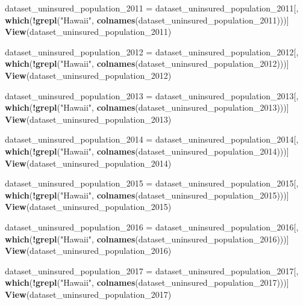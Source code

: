 \documentclass[
]{article}
\newenvironment{Shaded}{\begin{snugshade}}{\end{snugshade}}
\newcommand{\FunctionTok}[1]{\textcolor[rgb]{0.13,0.29,0.53}{\textbf{#1}}}
\newcommand{\NormalTok}[1]{#1}
\newcommand{\OtherTok}[1]{\textcolor[rgb]{0.56,0.35,0.01}{#1}}
\newcommand{\SpecialCharTok}[1]{\textcolor[rgb]{0.81,0.36,0.00}{\textbf{#1}}}
\newcommand{\StringTok}[1]{\textcolor[rgb]{0.31,0.60,0.02}{#1}}
\begin{document}
\begin{Shaded}
\begin{Highlighting}[]
\NormalTok{dataset\_uninsured\_population\_2011 }\OtherTok{=}\NormalTok{ dataset\_uninsured\_population\_2011[, }\FunctionTok{which}\NormalTok{(}\SpecialCharTok{!}\FunctionTok{grepl}\NormalTok{(}\StringTok{"Hawaii"}\NormalTok{, }\FunctionTok{colnames}\NormalTok{(dataset\_uninsured\_population\_2011)))]}
\FunctionTok{View}\NormalTok{(dataset\_uninsured\_population\_2011)}

\NormalTok{dataset\_uninsured\_population\_2012 }\OtherTok{=}\NormalTok{ dataset\_uninsured\_population\_2012[, }\FunctionTok{which}\NormalTok{(}\SpecialCharTok{!}\FunctionTok{grepl}\NormalTok{(}\StringTok{"Hawaii"}\NormalTok{, }\FunctionTok{colnames}\NormalTok{(dataset\_uninsured\_population\_2012)))]}
\FunctionTok{View}\NormalTok{(dataset\_uninsured\_population\_2012)}

\NormalTok{dataset\_uninsured\_population\_2013 }\OtherTok{=}\NormalTok{ dataset\_uninsured\_population\_2013[, }\FunctionTok{which}\NormalTok{(}\SpecialCharTok{!}\FunctionTok{grepl}\NormalTok{(}\StringTok{"Hawaii"}\NormalTok{, }\FunctionTok{colnames}\NormalTok{(dataset\_uninsured\_population\_2013)))]}
\FunctionTok{View}\NormalTok{(dataset\_uninsured\_population\_2013)}

\NormalTok{dataset\_uninsured\_population\_2014 }\OtherTok{=}\NormalTok{ dataset\_uninsured\_population\_2014[, }\FunctionTok{which}\NormalTok{(}\SpecialCharTok{!}\FunctionTok{grepl}\NormalTok{(}\StringTok{"Hawaii"}\NormalTok{, }\FunctionTok{colnames}\NormalTok{(dataset\_uninsured\_population\_2014)))]}
\FunctionTok{View}\NormalTok{(dataset\_uninsured\_population\_2014)}

\NormalTok{dataset\_uninsured\_population\_2015 }\OtherTok{=}\NormalTok{ dataset\_uninsured\_population\_2015[, }\FunctionTok{which}\NormalTok{(}\SpecialCharTok{!}\FunctionTok{grepl}\NormalTok{(}\StringTok{"Hawaii"}\NormalTok{, }\FunctionTok{colnames}\NormalTok{(dataset\_uninsured\_population\_2015)))]}
\FunctionTok{View}\NormalTok{(dataset\_uninsured\_population\_2015)}

\NormalTok{dataset\_uninsured\_population\_2016 }\OtherTok{=}\NormalTok{ dataset\_uninsured\_population\_2016[, }\FunctionTok{which}\NormalTok{(}\SpecialCharTok{!}\FunctionTok{grepl}\NormalTok{(}\StringTok{"Hawaii"}\NormalTok{, }\FunctionTok{colnames}\NormalTok{(dataset\_uninsured\_population\_2016)))]}
\FunctionTok{View}\NormalTok{(dataset\_uninsured\_population\_2016)}

\NormalTok{dataset\_uninsured\_population\_2017 }\OtherTok{=}\NormalTok{ dataset\_uninsured\_population\_2017[, }\FunctionTok{which}\NormalTok{(}\SpecialCharTok{!}\FunctionTok{grepl}\NormalTok{(}\StringTok{"Hawaii"}\NormalTok{, }\FunctionTok{colnames}\NormalTok{(dataset\_uninsured\_population\_2017)))]}
\FunctionTok{View}\NormalTok{(dataset\_uninsured\_population\_2017)}


\end{Highlighting}
\end{Shaded}
\end{document}
